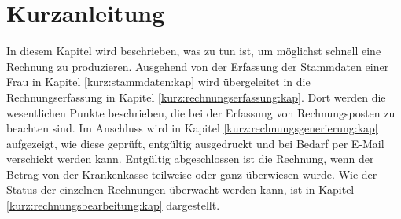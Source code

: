 






\chapter{Kurzanleitung}\label{Kurzanleitung}
In diesem Kapitel wird beschrieben, was zu tun ist, um möglichst schnell eine
Rechnung zu produzieren. Ausgehend von der Erfassung der Stammdaten einer
Frau in Kapitel \vref{kurz:stammdaten:kap} wird übergeleitet in die
Rechnungserfassung in Kapitel \vref{kurz:rechnungserfassung:kap}. Dort
werden die wesentlichen Punkte beschrieben, die bei der Erfassung von
Rechnungsposten zu beachten sind. Im Anschluss wird in Kapitel 
\vref{kurz:rechnungsgenerierung:kap} aufgezeigt, wie diese geprüft,
entgültig ausgedruckt und bei Bedarf per E-Mail verschickt werden kann.
Entgültig abgeschlossen ist die
Rechnung, wenn der Betrag von der Krankenkasse teilweise oder ganz
überwiesen wurde. Wie der Status der einzelnen Rechnungen überwacht werden
kann, ist in Kapitel \vref{kurz:rechnungsbearbeitung:kap} dargestellt.
%
